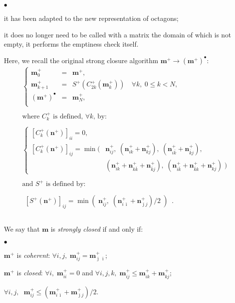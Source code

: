 \documentclass[twosides]{report}
\newenvironment{mylist}
        {\vskip-3mm\begin{list}{$\bullet$}{\setlength{\leftmargin}{.5cm}}}
        {\end{list}}
\renewcommand{\vec}[1]{{{\mathbf #1}}}
\newcommand{\itop}{{\,\bar{\imath}}}
\newcommand{\jtop}{{\bar{\jmath}}}
\newcommand{\ktop}{{\bar{k}}}
\begin{document}
\begin{mylist}
\item it has been adapted to the new representation of octagons;
\item it does no longer need to be called with a matrix the domain of which is
not empty, it performs the emptiness check itself.
\end{mylist}

Here, we recall the original strong closure algorithm
$\vec{m}^+\rightarrow(\vec{m}^+)^\bullet$:
$$\begin{array}{c}
\left\{
\begin{array}{lcl}
\vec{m}^+_0&=&\vec{m}^+,\\
\vec{m}^+_{k+1}&=&S^+(C^+_{2k}(\vec{m}^+_k))
\quad\forall k,\;0\leq k<N,\\
(\vec{m}^+)^\bullet&=&\vec{m}^+_{N},\\
\end{array}
\right.
\\\\
\mbox{where $C^+_k$ is defined, $\forall k$, by:}
\\\\
\left\{
\begin{array}{ll}
\left[C^+_k(\vec{n}^+)\right]_{ii}=0,\\ 
\left[C^+_k(\vec{n}^+)\right]_{ij}=\min(&
\vec{n}^+_{ij},\;(\vec{n}^+_{ik}+\vec{n}^+_{kj}),\;
(\vec{n}^+_{i \ktop}+\vec{n}^+_{\ktop j}),\\
&(\vec{n}^+_{ik}+\vec{n}^+_{k \ktop}+\vec{n}^+_{\ktop j}),\;
(\vec{n}^+_{i \ktop}+\vec{n}^+_{\ktop k}+\vec{n}^+_{k j})\;)
\end{array}
\right.
\\\\
\mbox{and $S^+$ is defined by:}
\\\\
\begin{array}{l}
\left[S^+(\vec{n}^+)\right]_{ij}=\min(\;\vec{n}^+_{ij},\;
(\vec{n}^+_{i\itop}+\vec{n}^+_{\jtop j})/2\;)\enspace.
\end{array}
\\\\
\end{array}$$

We say that $\vec{m}$ is {\em strongly closed\/} if and only if:
\begin{mylist}
\item $\vec{m}^+$ is {\it coherent}: 
$\forall i,j,\;\vec{m}^+_{ij}=\vec{m}^+_{\jtop \itop}$;
\item $\vec{m}^+$ is {\it closed}:
$\forall i,\;\vec{m}^+_{ii}=0$ and
$\forall i,j,k,\;
\vec{m}^+_{ij}\leq\vec{m}^+_{ik}+\vec{m}^+_{kj}$;
\item $\forall i,j,\;$ $\vec{m}^+_{ij}\leq (\vec{m}^+_{i \itop}
+\vec{m}^+_{\jtop j})/2$.
\end{mylist}
\end{document}
